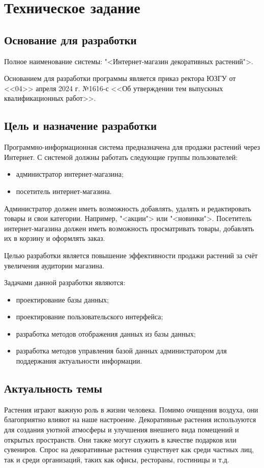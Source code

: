 \section{Техническое задание}
\subsection{Основание для разработки}

Полное наименование системы: "<Интернет-магазин декоративных растений">.

Основанием для разработки программы является приказ ректора ЮЗГУ от <<04>> апреля 2024 г. №1616-с <<Об утверждении тем выпускных квалификационных работ>>.


\subsection{Цель и назначение разработки}
Программно-информационная система предназначена для продажи растений через Интернет.
С системой должны работать следующие группы пользователей:
\begin{itemize}
	\item администратор интернет-магазина;
	\item посетитель интернет-магазина.
\end{itemize}

Администратор должен иметь возможность добавлять, удалять и редактировать товары и свои категории. Например, "<акции"> или "<новинки">.
Посетитель интернет-магазина должен иметь возможность просматривать товары, добавлять их в корзину и оформлять заказ.

Целью разработки является повышение эффективности продажи растений за счёт увеличения аудитории магазина.

Задачами данной разработки являются:
\begin{itemize}
	\item проектирование базы данных;
	\item проектирование пользовательского интерфейса;
	\item разработка методов отображения данных из базы данных;
	\item разработка методов управления базой данных администратором для поддержания актуальности информации.
\end{itemize}

\subsection{Актуальность темы}
Растения играют важную роль в жизни человека. Помимо очищения воздуха, они благоприятно влияют на наше настроение. Декоративные растения используются для создания уютной атмосферы и улучшения внешнего вида помещений и открытых пространств. Они также могут служить в качестве подарков или сувениров. Спрос на декоративные растения существует как среди частных лиц, так и среди организаций, таких как офисы, рестораны, гостиницы и т.д. 

